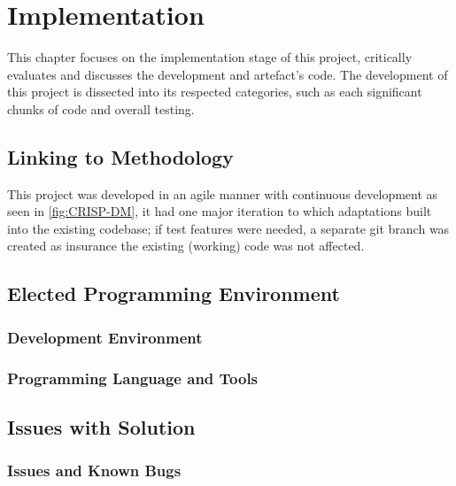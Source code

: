 \chapter{Implementation}

This chapter focuses on the implementation stage of this project, critically evaluates and discusses the development and artefact's code. The development of this project is dissected into its respected categories, such as each significant chunks of code and overall testing.

\section{Linking to Methodology}

This project was developed in an agile manner with continuous development as seen in \autoref{fig:CRISP-DM}, it had one major iteration to which adaptations built into the existing codebase; if test features were needed, a separate git branch was created as insurance the existing (working) code was not affected.

\section{Elected Programming Environment}

\subsection{Development Environment}

\subsection{Programming Language and Tools}













\section{Issues with Solution}

\subsection{Issues and Known Bugs}

